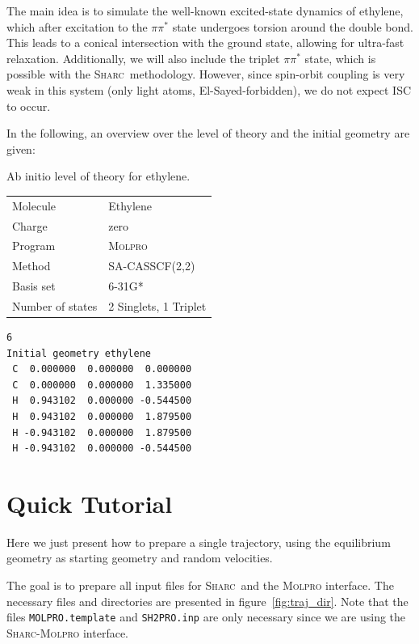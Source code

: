 \documentclass[a4paper,11pt,DIV=15,openany]{scrbook}
\newcommand{\sharc}{\textsc{Sharc}}
\newcommand{\ttt}[1]{\texttt{#1}}
\newenvironment{example}{
  \vspace{0mm}
  \definecolor{shadecolor}{HTML}{E4F4FF}
  \begin{shaded}
}{
  \end{shaded}
}
\begin{document}
The main idea is to simulate the well-known excited-state dynamics of ethylene, which after excitation to the $\pi\pi^*$ state undergoes torsion around the double bond. This leads to a conical intersection with the ground state, allowing for ultra-fast relaxation. Additionally, we will also include the triplet $\pi\pi^*$ state, which is possible with the \sharc\ methodology. However, since spin-orbit coupling is very weak in this system (only light atoms, El-Sayed-forbidden), we do not expect ISC to occur. 

In the following, an overview over the level of theory and the initial geometry are given:

\begin{example}
\begin{minipage}{0.45\textwidth}
  \centering
  Ab initio level of theory for ethylene.
  \begin{tabular}{ll}
    \toprule
    Molecule            &Ethylene\\
    Charge              &zero\\
    Program             &\textsc{Molpro}\\
    Method              &SA-CASSCF(2,2)\\
    Basis set           &6-31G*\\
    Number of states    &2 Singlets, 1 Triplet\\
    \bottomrule
  \end{tabular}
\end{minipage}
\hfill
\begin{minipage}{0.45\textwidth}
  \begin{verbatim}
6
Initial geometry ethylene
 C  0.000000  0.000000  0.000000
 C  0.000000  0.000000  1.335000
 H  0.943102  0.000000 -0.544500
 H  0.943102  0.000000  1.879500
 H -0.943102  0.000000  1.879500
 H -0.943102  0.000000 -0.544500
  \end{verbatim}
\end{minipage}
\end{example}


\chapter{Quick Tutorial}

Here we just present how to prepare a single trajectory, using the equilibrium geometry as starting geometry and random velocities. 

The goal is to prepare all input files for \sharc\ and the \textsc{Molpro} interface. The necessary files and directories are presented in figure~\ref{fig:traj_dir}. Note that the files \ttt{MOLPRO.template} and \ttt{SH2PRO.inp} are only necessary since we are using the \sharc-\textsc{Molpro} interface.
\end{document}
